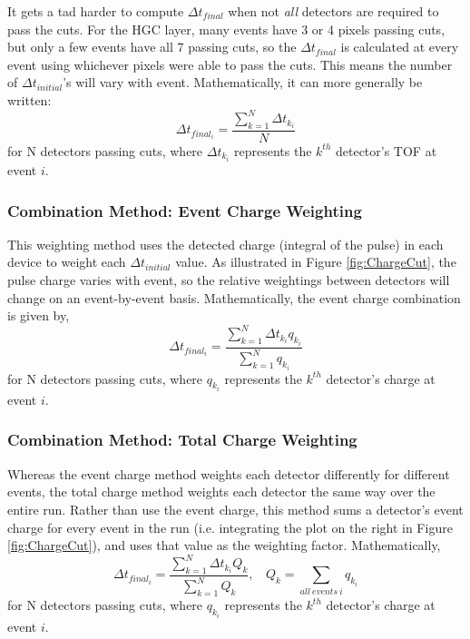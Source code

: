 \documentclass[twocolumn,aps,prd,reprint,superscriptaddress,floatfix]{revtex4-1}
\begin{document}
It gets a tad harder to compute $\Delta t_{final}$ when not \textit{all} detectors are required to pass the cuts.
For the HGC layer, many events have 3 or 4 pixels passing cuts, but only a few events have all 7 passing cuts, so the $\Delta t_{final}$ is calculated at every event using whichever pixels were able to pass the cuts. 
This means the number of $\Delta t_{initial}$'s will vary with event. 
Mathematically, it can more generally be written:
\[
\Delta t_{final_i} =
\dfrac{\sum\limits_{k=1}^N \Delta t_{k_i}} {N} 
\]
for N detectors passing cuts, where $\Delta t_{k_i}$ represents the $k^{th}$ detector's TOF at event $i$.

\subsubsection{Combination Method: Event Charge Weighting}
This weighting method uses the detected charge (integral of the pulse) in each device to weight each $\Delta t_{initial}$ value. 
As illustrated in Figure \ref{fig:ChargeCut}, the pulse charge varies with event, so the relative weightings between detectors will change on an event-by-event basis. 
Mathematically, the event charge combination is given by,
\[
\Delta t_{final_i} =
\dfrac{\sum\limits_{k=1}^N \Delta t_{k_i} q_{k_i} }
	{\sum\limits_{k=1}^N q_{k_i} }
\]
for N detectors passing cuts, where $q_{k_i}$ represents the $k^{th}$ detector's charge at event $i$.

\subsubsection{Combination Method: Total Charge Weighting}
Whereas the event charge method weights each detector differently for different events, the total charge method weights each detector the same way over the entire run. 
Rather than use the event charge, this method sums a detector's event charge for every event in the run (i.e. integrating the plot on the right in Figure \ref{fig:ChargeCut}), and uses that value as the weighting factor. 
Mathematically,
\[
\Delta t_{final_i} =
\dfrac{\sum\limits_{k=1}^N \Delta t_{k_i} Q_k }
	{\sum\limits_{k=1}^N Q_k }
,\ \ \ \ 
Q_k = \sum_{all\ events\ i} q_{k_i}
\]
for N detectors passing cuts, where $q_{k_i}$ represents the $k^{th}$ detector's charge at event $i$.
\end{document}
